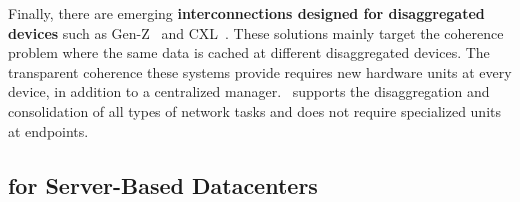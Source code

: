 Finally, there are emerging \textbf{interconnections designed for disaggregated devices} such as Gen-Z~\cite{GenZ} and CXL~\cite{CXL}.
These solutions mainly target the coherence problem where the same data is cached at different disaggregated devices.
The transparent coherence these systems provide requires new hardware units at every device, in addition to a centralized manager.
\snic\ supports the disaggregation and consolidation of all types of network tasks and does not require specialized units at endpoints.

%







\subsection{for Server-Based Datacenters}
\label{sec:motivation-server}

